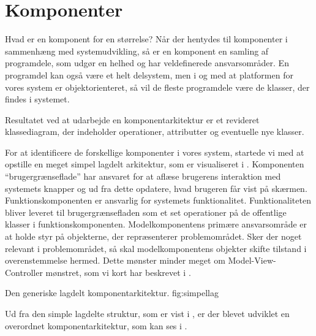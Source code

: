 \section{Komponenter}
\label{sec:komponenter}
Hvad er en komponent for en størrelse? Når der hentydes til komponenter i sammenhæng med systemudvikling, så er en komponent en samling af programdele, som udgør en helhed og har veldefinerede ansvarsområder. En programdel kan også være et helt delsystem, men i og med at platformen for vores system er objektorienteret, så vil de fleste programdele være de klasser, der findes i systemet. 

Resultatet ved at udarbejde en komponentarkitektur er et revideret klassediagram, der indeholder operationer, attributter og eventuelle nye klasser.

For at identificere de forskellige komponenter i vores system, startede vi med at opstille en meget simpel lagdelt arkitektur, som er visualiseret i . 
Komponenten ``brugergrænseflade'' har ansvaret for at aflæse brugerens interaktion med systemets knapper og ud fra dette opdatere, hvad brugeren får vist på skærmen. 
Funktionskomponenten er ansvarlig for systemets funktionalitet. Funktionaliteten bliver leveret til brugergrænsefladen som et set operationer på de offentlige klasser i funktionskomponenten. 
Modelkomponentens primære ansvarsområde er at holde styr på objekterne, der repræsenterer problemområdet. Sker der noget relevant i problemområdet, så skal modelkomponentens objekter skifte tilstand i overenstemmelse hermed. 
Dette mønster minder meget om Model-View-Controller mønstret, som vi kort har beskrevet i .

	{Den generiske lagdelt komponentarkitektur.}
	{fig:simpellag}

Ud fra den simple lagdelte struktur, som er vist i , er der blevet udviklet en overordnet komponentarkitektur, som kan ses i .




